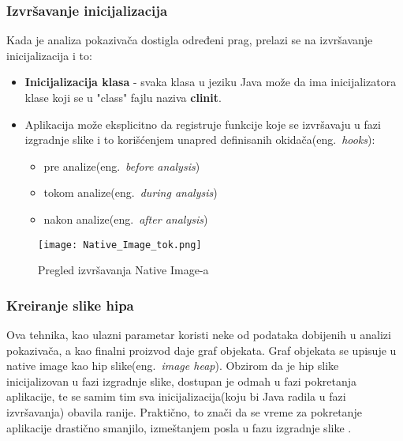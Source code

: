 \documentclass[a4paper]{article}
\begin{document}
\subsubsection{Izvršavanje inicijalizacija}
Kada je analiza pokazivača dostigla određeni prag, prelazi se na izvršavanje inicijalizacija i to:
\begin{itemize}
    \item \textbf{Inicijalizacija klasa} - svaka klasa u jeziku Java može da ima inicijalizatora klase koji se u "class" fajlu naziva \textbf{clinit}.
    \item Aplikacija može eksplicitno da registruje funkcije koje se izvršavaju u fazi izgradnje slike i to korišćenjem unapred definisanih okidača(eng.~{\em hooks}):
    \begin{itemize}
        \item pre analize(eng.~{\em before analysis})
        \item tokom analize(eng.~{\em during analysis})
        \item nakon analize(eng.~{\em after analysis})
    \end{itemize}
\end{itemize}


\begin{figure}[h!]
\begin{center}
\texttt{[image: Native\_Image\_tok.png]}
\end{center}
\caption{Pregled izvršavanja Native Image-a}
\label{fig:pregledIzvrsavanja}
\end{figure}


\subsubsection{Kreiranje slike hipa}
Ova tehnika, kao ulazni parametar koristi neke od podataka dobijenih u analizi pokazivača, a kao finalni proizvod daje graf objekata. Graf objekata se upisuje u native image kao hip slike(eng.~{\em image heap}). Obzirom da je hip slike inicijalizovan u fazi izgradnje slike, dostupan je odmah u fazi pokretanja aplikacije, te se samim tim sva inicijalizacija(koju bi Java radila u fazi izvršavanja) obavila ranije. Praktično, to znači da se vreme za pokretanje aplikacije drastično smanjilo, izmeštanjem posla u fazu izgradnje slike \cite{AnalizaPokazivaca}.
\end{document}
